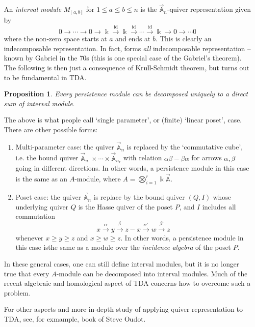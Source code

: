 \documentclass[11pt,a4paper]{article}
\numberwithin{equation}{section}
\theoremstyle{all}
\newtheorem{proposition}[theorem]{Proposition}
\theoremstyle{remark}
\newcommand{\bbA}{\mathbb{A}}
\newcommand{\id}{\operatorname{id}}
\newcommand{\defn}[1]{\textsl{\color{darkblue} #1}}
\begin{document}
An \defn{interval module} $M_{[a,b]}$ for $1\le a \le b\le n$ is the $\vec{\bbA}_n$-quiver representation given by 
\[
0 \to \cdots \to 0\to \Bbbk \xrightarrow{\id} \Bbbk \xrightarrow{\id}  \cdots  \xrightarrow{\id}\Bbbk \to 0 \to\cdots 0 \]
where the non-zero space starts at $a$ and ends at $b$.
This is clearly an indecomposable representation.  In fact, forms \emph{all} indecomposable representation -- known by Gabriel in the 70s (this is one special case of the Gabriel's theorem).
The following is then just a consequence of Krull-Schmidt theorem, but turns out to be fundamental in TDA.

\begin{proposition}
Every persistence module can be decomposed uniquely to a direct sum of interval module.
\end{proposition}

\medskip
The above is what people call `single parameter', or (finite) `linear poset', case.
There are other possible forms:
\begin{enumerate}
\item Multi-parameter case:  the quiver $\vec{\bbA}_n$ is replaced by the `commutative cube', i.e. the bound quiver $\vec{\bbA}_{n_1} \times \cdots \times \vec{\bbA}_{n_r}$ with relation $\alpha\beta -\beta\alpha$ for arrows $\alpha,\beta$ going in different directions.  In other words, a persistence module in this case is the same as an $A$-module, where $A = \bigotimes_{i=1}^r \Bbbk \vec{\bbA}$.

\item Poset case: the quiver $\vec{\bbA}_n$ is replace by the bound quiver $(Q,I)$ whose underlying quiver $Q$ is the Hasse quiver of the poset $P$, and $I$ includes all commutation 
\[
x \xrightarrow{\alpha}  y \xrightarrow{\beta}z - x\xrightarrow{\alpha'} w \xrightarrow{\beta'} z
\]
whenever $x\ge y\ge z$ and $x\ge w\ge z$.  In other words, a persistence module in this case isthe same as a module over the \defn{incidence algebra} of the poset $P$.
\end{enumerate}
In these general cases, one can still define interval modules, but it is no longer true that every $A$-module can be decomposed into interval modules.  Much of the recent algebraic and homological aspect of TDA concerns how to overcome such a problem.


For other aspects and more in-depth study of applying quiver representation to TDA, see, for exmample, book of Steve Oudot.
\end{document}
